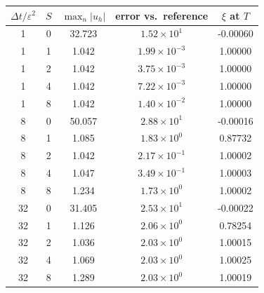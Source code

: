 \begin{tabular}{cc ccc}
\toprule
$\Delta t/\varepsilon^2$ & $S$ & $\max_n|u_h|$ & error vs.\ reference & $\xi$ at $T$\\
\midrule
1 & 0 & 32.723 & $1.52{\times}10^{1}$ & -0.00060\\
1 & 1 & 1.042 & $1.99{\times}10^{-3}$ & 1.00000\\
1 & 2 & 1.042 & $3.75{\times}10^{-3}$ & 1.00000\\
1 & 4 & 1.042 & $7.22{\times}10^{-3}$ & 1.00000\\
1 & 8 & 1.042 & $1.40{\times}10^{-2}$ & 1.00000\\
8 & 0 & 50.057 & $2.88{\times}10^{1}$ & -0.00016\\
8 & 1 & 1.085 & $1.83{\times}10^{0}$ & 0.87732\\
8 & 2 & 1.042 & $2.17{\times}10^{-1}$ & 1.00002\\
8 & 4 & 1.047 & $3.49{\times}10^{-1}$ & 1.00003\\
8 & 8 & 1.234 & $1.73{\times}10^{0}$ & 1.00002\\
32 & 0 & 31.405 & $2.53{\times}10^{1}$ & -0.00022\\
32 & 1 & 1.126 & $2.06{\times}10^{0}$ & 0.78254\\
32 & 2 & 1.036 & $2.03{\times}10^{0}$ & 1.00015\\
32 & 4 & 1.069 & $2.03{\times}10^{0}$ & 1.00025\\
32 & 8 & 1.289 & $2.03{\times}10^{0}$ & 1.00019\\
\bottomrule
\end{tabular}
